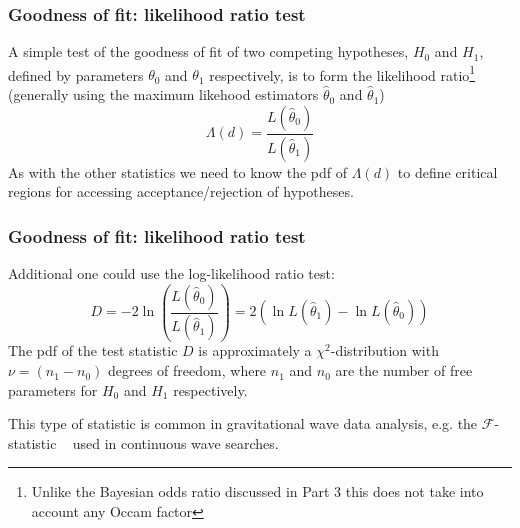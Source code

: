 \begin{frame}

\frametitle{Goodness of fit: likelihood ratio test}
\label{goodnessoffit:likelihoodratiotest}

A simple test of the goodness of fit of two competing hypotheses, $H_0$ and $H_1$, defined by parameters $\theta_0$ and
$\theta_1$ respectively, is to form the likelihood ratio\footnote{Unlike the Bayesian odds ratio discussed in Part 3 this does not take into account any Occam factor} (generally using the maximum likehood
estimators $\hat{\theta}_0$ and $\hat{\theta}_1$)
\[
\Lambda(d) = \frac{L(\hat{\theta}_0)}{L(\hat{\theta}_1)}
\]
As with the other statistics we need to know the pdf of $\Lambda(d)$ to define critical regions for accessing
acceptance\slash rejection of hypotheses.

\end{frame}

\begin{frame}

\frametitle{Goodness of fit: likelihood ratio test}
\label{goodnessoffit:likelihoodratiotest}

Additional one could use the log-likelihood ratio test:
\[
D = -2\ln{\left(\frac{L(\hat{\theta}_0)}{L(\hat{\theta}_1)} \right)} = 2\left(\ln{L(\hat{\theta}_1)} - \ln{L(\hat{\theta}_0)}\right)
\]
The pdf of the test statistic $D$ is approximately a $\chi^2$-distribution with $\nu = (n_1-n_0)$ degrees
of freedom, where $n_1$ and $n_0$ are the number of free parameters for $H_0$ and $H_1$ respectively.

This type of statistic is common in gravitational wave data analysis, e.g. the $\mathcal{F}$-statistic ~\citep{JKS}
used in continuous wave searches.

\end{frame}

